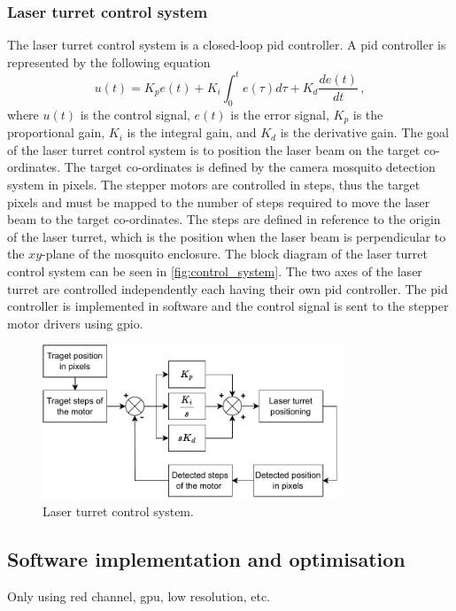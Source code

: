 \subsubsection{Laser turret control system}
The laser turret control system is a closed-loop \gls{pid} controller. A \gls{pid} controller is represented by the following equation
\begin{equation}
    \label{eq:pid_controller}
    u(t) = K_p e(t) + K_i \int_{0}^{t} e(\tau) d\tau + K_d \frac{de(t)}{dt}\,,
\end{equation}
where $u(t)$ is the control signal, $e(t)$ is the error signal, $K_p$ is the proportional gain, $K_i$ is the integral gain, and $K_d$ is the derivative gain. The goal of the laser turret control system is to position the laser beam on the target co-ordinates. The target co-ordinates is defined by the camera mosquito detection system in pixels. The stepper motors are controlled in steps, thus the target pixels and must be mapped to the number of steps required to move the laser beam to the target co-ordinates. The steps are defined in reference to the origin of the laser turret, which is the position when the laser beam is perpendicular to the $xy$-plane of the mosquito enclosure. The block diagram of the laser turret control system can be seen in \autoref{fig:control_system}. The two axes of the laser turret are controlled independently each having their own \gls{pid} controller. The \gls{pid} controller is implemented in software and the control signal is sent to the stepper motor drivers using \gls{gpio}.
\begin{figure}[h]
    \centering
    \includegraphics[width=0.8\textwidth]{figures/control_system.pdf}
    \caption{Laser turret control system.}
    \label{fig:control_system}
\end{figure}



\subsection{Software implementation and optimisation}
Only using red channel, \gls{gpu}, low resolution, etc.

